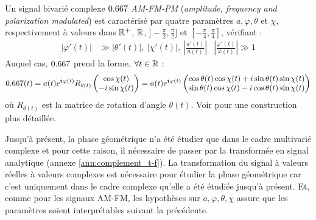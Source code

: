 \begin{definition}[Signal AM-FM-PM] \label{def:AM-FM-PM}
	Un signal bivarié complexe $\x$ \emph{AM-FM-PM} (\emph{amplitude, frequency and polarization modulated}) est caractérisé par quatre paramètres $a,\varphi,\theta$ et $\chi$, respectivement à valeurs dans $\mathbb{R}^+$, $\mathbb{R}$, $]-\frac{\pi}{2}, \frac{\pi}{2}]$ et $[-\frac{\pi}{4}, \frac{\pi}{4}]$, vérifiant :
	\begin{align}\label{eq:condi_AM-FM-PM}
		\big| \varphi'(t) \big| &\gg \big| \theta'(t) \big| ,\ \big| \chi'(t) \big| ,\ \left| \frac{a'(t)}{a(t)}\right|  &  \left| \frac{\varphi'(t)}{\varphi(t)}\right| \gg 1
	\end{align}
	Auquel cas, $\x$ prend la forme, $\forall t\in\mathbb{R}$ :
	\begin{equation}\label{eq:AM-FM-PM}
		\x(t) = a(t)e^{\i \varphi(t)} R_{\theta(t)} \begin{pmatrix} \cos\chi(t) \\ -i\sin\chi(t) \end{pmatrix} 
		= a(t)e^{\i \varphi(t)} \begin{pmatrix} \cos\theta(t) \cos\chi(t) + i\sin\theta(t) \sin\chi(t) \\ \sin\theta(t) \cos\chi(t) - i\cos\theta(t) \sin\chi(t) \end{pmatrix}
	\end{equation}
	où $R_{\theta(t)}$ est la matrice de rotation d'angle $\theta(t)$. Voir \cite[ann. 4.B]{flamant_approche_2018} pour une construction plus détaillée.
\end{definition}
\skipl

Jusqu'à présent, la phase géométrique n'a été étudier que dans le cadre multivarié complexe et pour cette raison, il nécessaire de passer par la transformée en signal analytique (\cf annexe \cref{ann:complement_t-f}). 
La transformation du signal à valeurs réelles à valeurs complexes est nécessaire
pour étudier la phase géométrique car c'est uniquement dans le cadre complexe qu'elle a été étudiée jusqu'à présent. 
Et, comme pour les signaux AM-FM, les hypothèses sur $a,\varphi,\theta,\chi$ assure que les paramètres soient interprétables suivant la  précédente.
\\

